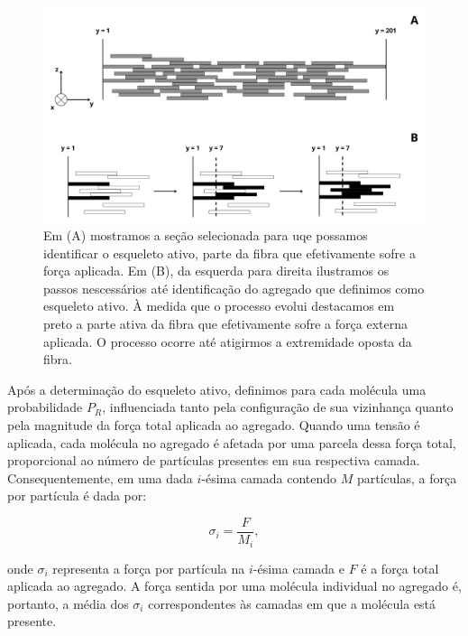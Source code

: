 \documentclass{article}
\begin{document}
        \begin{figure}[H]
            \centering
            \includegraphics[width=\textwidth]{figures/esqueleto.png}
    
            \caption{Em (A) mostramos a seção selecionada para uqe possamos identificar o esqueleto ativo, parte da fibra 
            que efetivamente sofre a força aplicada. Em (B), da esquerda para direita ilustramos os passos nescessários 
            até identificação do agregado que definimos como esqueleto ativo. À medida que o processo evolui destacamos 
            em preto a parte ativa da fibra que efetivamente sofre a força externa aplicada. O processo ocorre até 
            atigirmos a extremidade oposta da fibra.}  
    
            \label{M3}
        \end{figure}

        Após a determinação do esqueleto ativo, definimos para cada molécula uma probabilidade \(P_{R}\), influenciada tanto pela configuração de
        sua vizinhança quanto pela magnitude da força total aplicada ao agregado. Quando uma tensão é aplicada, cada molécula no agregado é 
        afetada por uma parcela dessa força total, proporcional ao número de partículas presentes em sua respectiva camada. Consequentemente, em 
        uma dada \(i\)-ésima camada contendo \(M\) partículas, a força por partícula é dada por:  

        \begin{equation}
            \sigma_{i} = \frac{F}{M_{i}},
        \end{equation}
            

        onde \(\sigma_{i}\) representa a força por partícula na \(i\)-ésima camada e \(F\) é a força total aplicada ao agregado. A força sentida 
        por uma molécula individual no agregado é, portanto, a média dos \(\sigma_{i}\) correspondentes às camadas em que a molécula está presente. 
\end{document}
